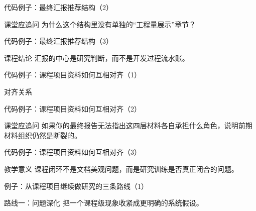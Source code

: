 \begin{frame}{代码例子：最终汇报推荐结构（2）}
\begin{block}{课堂应追问}
    为什么这个结构里没有单独的“工程量展示”章节？
  \end{block}
\end{frame}

\begin{frame}{代码例子：最终汇报推荐结构（3）}
\begin{block}{课程结论}
    汇报的中心是研究判断，而不是开发过程流水账。
  \end{block}
\end{frame}

\begin{frame}{代码例子：课程项目资料如何互相对齐（1）}
\begin{block}{对齐关系}
    {\ttfamily\small
    \par
    \par
    \par
    \par
    }
  \end{block}
\end{frame}

\begin{frame}{代码例子：课程项目资料如何互相对齐（2）}
\begin{block}{课堂应追问}
    如果你的最终报告无法指出这四层材料各自承担什么角色，说明前期材料组织仍然是断裂的。
  \end{block}
\end{frame}

\begin{frame}{代码例子：课程项目资料如何互相对齐（3）}
\begin{block}{教学意义}
    课程闭环不是文档美观问题，而是研究训练是否真正闭合的问题。
  \end{block}
\end{frame}

\begin{frame}{例子：从课程项目继续做研究的三条路线（1）}
\begin{block}{路线一：问题深化}
    把一个课程级现象收紧成更明确的系统假设。
  \end{block}
\end{frame}

